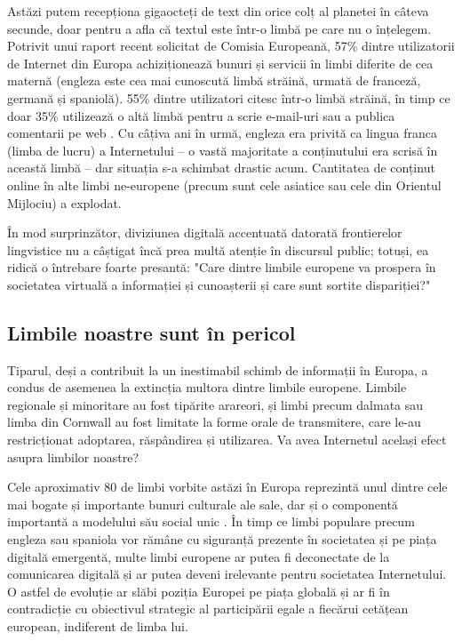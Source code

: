 \documentclass[]{../../metanetpaper}
\begin{document}
\begin{multicols}{2}
Astăzi putem recepționa gigaocteți de text din orice colț al planetei în câteva secunde, doar pentru a afla că textul este într-o limbă pe care nu o înțelegem. Potrivit unui raport recent solicitat de Comisia Europeană, 57\% dintre utilizatorii de Internet din Europa achiziționează bunuri și servicii în limbi diferite de cea maternă (engleza este cea mai cunoscută limbă străină, urmată de franceză, germană și spaniolă). 55\% dintre utilizatori citesc într-o limbă străină, în timp ce doar 35\% utilizează o altă limbă pentru a scrie e-mail-uri sau a publica comentarii pe web \cite{EC1}. Cu câțiva ani în urmă, engleza era privită ca lingua franca (limba de lucru) a Internetului – o vastă majoritate a conținutului era scrisă în această limbă – dar situația s-a schimbat drastic acum. Cantitatea de conținut online în alte limbi ne-europene (precum sunt cele asiatice sau cele din Orientul Mijlociu) a explodat.

În mod surprinzător, diviziunea digitală accentuată datorată frontierelor lingvistice nu a câștigat încă prea multă atenție în discursul public; totuși, ea ridică o întrebare foarte presantă: "Care dintre limbile europene va prospera în societatea virtuală a informației și cunoașterii și care sunt sortite dispariției?"

\subsection{Limbile noastre sunt în pericol}

Tiparul, deși a contribuit la un inestimabil schimb de informații în Europa, a condus de asemenea la extincția multora dintre limbile europene. Limbile regionale și minoritare au fost tipărite arareori, și limbi precum dalmata sau limba din Cornwall au fost limitate la forme orale de transmitere, care le-au restricționat adoptarea, răspândirea și utilizarea. Va avea Internetul același efect asupra limbilor noastre?

Cele aproximativ 80 de limbi vorbite astăzi în Europa reprezintă unul dintre cele mai bogate și importante bunuri culturale ale sale, dar și o componentă importantă a modelului său social unic \cite{EC2}. În timp ce limbi populare precum engleza sau spaniola vor rămâne cu siguranță prezente în societatea și pe piața digitală emergentă, multe limbi europene ar putea fi deconectate de la comunicarea digitală și ar putea deveni irelevante pentru societatea Internetului. O astfel de evoluție ar slăbi poziția Europei pe piața globală și ar fi în contradicție cu obiectivul strategic al participării egale a fiecărui cetățean european, indiferent de limba lui. 


\end{multicols}
\end{document}

